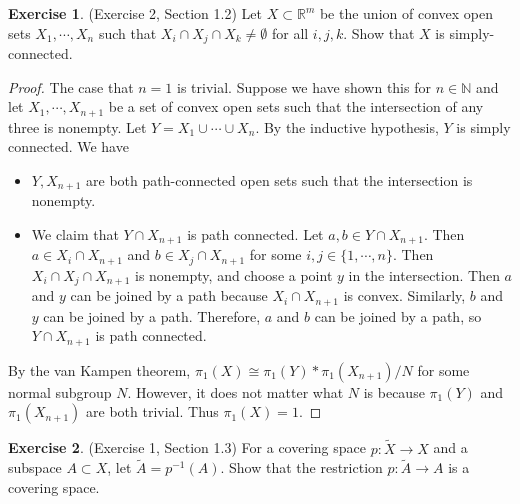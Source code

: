 \documentclass[12pt, psamsfonts]{amsart}
\theoremstyle{definition}
\newtheorem*{exer}{Exercise}
\theoremstyle{remark}
\numberwithin{equation}{section}
\begin{document}
\begin{exer}{(Exercise 2, Section 1.2)}
  Let $X \subset \mathbb{R}^m$ be the union of convex open sets $X_1, \cdots, X_n$ such that $X_i \cap X_j \cap X_k \ne \emptyset$ for all $i, j, k$.
  Show that $X$ is simply-connected.
\end{exer}

\begin{proof}
  The case that $n = 1$ is trivial.
  Suppose we have shown this for $n \in \mathbb{N}$ and let $X_1, \cdots, X_{n + 1}$ be a set of convex open sets such that the intersection of any three is nonempty.
  Let $Y = X_1 \cup \cdots \cup X_n$.
  By the inductive hypothesis, $Y$ is simply connected.
  We have
  \begin{itemize}
    \item
      $Y, X_{n + 1}$ are both path-connected open sets such that the intersection is nonempty.
    \item
      We claim that $Y \cap X_{n + 1}$ is path connected.
      Let $a, b \in Y \cap X_{n + 1}$.
      Then $a \in X_i \cap X_{n + 1}$ and $b \in X_j \cap X_{n + 1}$ for some $i, j \in \{ 1, \cdots, n \}$.
      Then $X_i \cap X_j \cap X_{n + 1}$ is nonempty, and choose a point $y$ in the intersection.
      Then $a$ and $y$ can be joined by a path because $X_i \cap X_{n + 1}$ is convex.
      Similarly, $b$ and $y$ can be joined by a path.
      Therefore, $a$ and $b$ can be joined by a path, so $Y \cap X_{n + 1}$ is path connected.
  \end{itemize}
  By the van Kampen theorem, $\pi_1(X) \cong \pi_1(Y) * \pi_1(X_{n + 1}) / N$ for some normal subgroup $N$.
  However, it does not matter what $N$ is because $\pi_1(Y)$ and $\pi_1(X_{n + 1})$ are both trivial.
  Thus $\pi_1(X) = 1$.
\end{proof}

\begin{exer}{(Exercise 1, Section 1.3)}
  For a covering space $p: \tilde{X} \rightarrow X$ and a subspace $A \subset X$, let $\tilde{A} = p^{-1}(A)$.
  Show that the restriction $p: \tilde{A} \rightarrow A$ is a covering space.
\end{exer}
\end{document}
